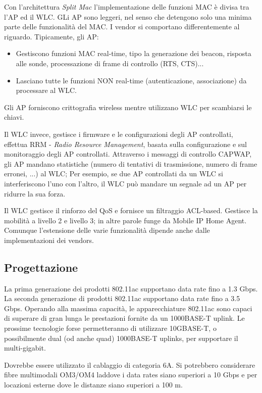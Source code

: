 Con l'architettura \textit{Split Mac} l'implementazione delle funzioni MAC è divisa tra l'AP ed il WLC. GLi AP sono leggeri, nel senso che detengono solo una minima parte delle funzionalità del MAC. I vendor si comportano differentemente al riguardo. Tipicamente, gli AP:

\begin{itemize}

\item Gestiscono funzioni MAC real-time, tipo la generazione dei beacon, risposta alle sonde, processazione di frame di controllo (RTS, CTS)...\
\item Lasciano tutte le funzioni NON real-time (autenticazione, associazione) da processare al WLC. 

\end{itemize}

Gli AP forniscono crittografia wireless mentre utilizzano WLC per scambiarsi le chiavi.

Il WLC invece, gestisce i firmware e le configurazioni degli AP controllati, effettua RRM - \textit{Radio Resource Management}, basata sulla configurazione e sul monitoraggio degli AP controllati. Attraverso i messaggi di controllo CAPWAP, gli AP mandano statistiche (numero di tentativi di trasmissione, numero di frame erronei, ...) al WLC;
Per esempio, se due AP controllati da un WLC si interferiscono l'uno con l'altro, il WLC può mandare un segnale ad un AP per ridurre la sua forza.

Il WLC gestisce il rinforzo del QoS e fornisce un filtraggio ACL-based. Gestisce la mobilità a livello 2 e livello 3; in altre parole funge da Mobile IP Home Agent. Comunque l'estensione delle varie funzionalità dipende anche dalle implementazioni dei vendors.


\subsection{Progettazione}

La prima generazione dei prodotti 802.11ac supportano data rate fino a 1.3 Gbps. La seconda generazione di prodotti 802.11ac supportano data rate fino a 3.5 Gbps. Operando alla massima capacità, le apparecchiature 802.11ac sono capaci di superare di gran lunga le prestazioni fornite da un 1000BASE-T uplink. Le prossime tecnologie forse permetteranno di utilizzare 10GBASE-T, o possibilmente dual (od anche quad) 1000BASE-T uplinks, per supportare il multi-gigabit.

Dovrebbe essere utilizzato il cablaggio di categoria 6A. Si potrebbero considerare fibre multimodali OM3/OM4 laddove i data rates siano superiori a 10 Gbps e per locazioni esterne dove le distanze siano superiori a 100 m. 

